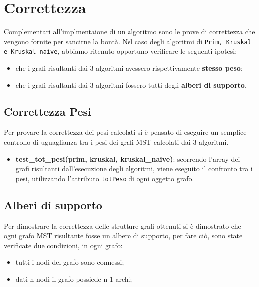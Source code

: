 \section{Correttezza}
\label{correttezza}

Complementari all'implmentaione di un algoritmo sono le prove di correttezza che vengono fornite per sancirne la bontà. Nel caso degli algoritmi di \texttt{Prim, Kruskal e Kruskal-naive}, abbiamo ritenuto opportuno verificare le seguenti ipotesi:

\begin{itemize}
    
    \item che i grafi risultanti dai 3 algoritmi avessero rispettivamente \textbf{stesso peso};
    
    \item che i grafi risultanti dai 3 algoritmi fossero tutti degli \textbf{alberi di supporto}.

\end{itemize}

\subsection{Correttezza Pesi}
\label{correttezza_pesi}
Per provare la correttezza dei pesi calcolati si è pensato di eseguire un semplice controllo di uguaglianza tra i pesi dei grafi MST calcolati dai 3 algoritmi.

\begin{itemize}
    \item \textbf{test\_tot\_pesi(prim, kruskal, kruskal\_naive)}: scorrendo l'array dei grafi risultanti dall'esecuzione degli algoritmi, viene eseguito il confronto tra i pesi, utilizzando l'attributo \texttt{totPeso} di ogni \hyperlink{subsection.2.2}{oggetto grafo}.
\end{itemize}

\subsection{Alberi di supporto}
\label{alberi_supporto}

Per dimostrare la correttezza delle strutture grafi ottenuti si è dimostrato che ogni grafo MST risultante fosse un albero di supporto, per fare ciò, sono state verificate due condizioni, in ogni grafo:

\begin{itemize}
    \item tutti i nodi del grafo sono connessi;
    \item dati n nodi il grafo possiede n-1 archi;
\end{itemize}


